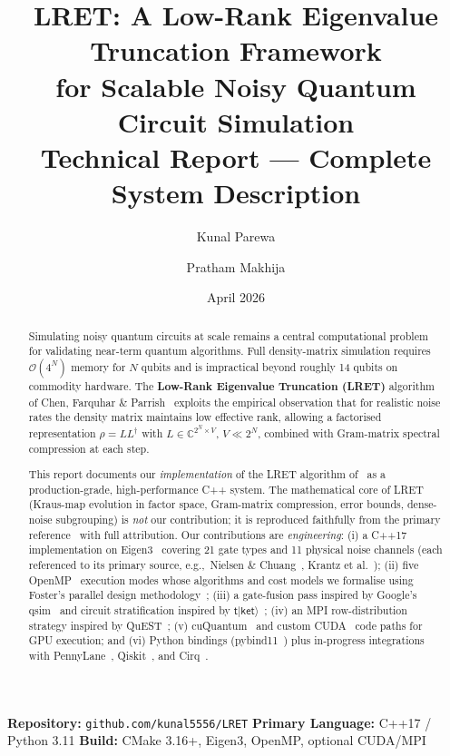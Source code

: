 \documentclass[11pt,a4paper]{article}
\title{%
  \vspace{-1cm}
  {\LARGE\bfseries LRET: A Low-Rank Eigenvalue Truncation Framework}\\[6pt]
  {\large for Scalable Noisy Quantum Circuit Simulation}\\[10pt]
  {\normalsize Technical Report --- Complete System Description}
}
\author{
  Kunal Parewa \and Pratham Makhija
}
\date{April 2026}
\begin{document}

\maketitle
\thispagestyle{empty}

\begin{infobox}
\textbf{Repository:} \texttt{github.com/kunal5556/LRET}\quad\textbullet\quad
\textbf{Primary Language:} C++17 / Python 3.11\quad\textbullet\quad
\textbf{Build:} CMake 3.16+, Eigen3, OpenMP, optional CUDA/MPI
\end{infobox}

\begin{abstract}
Simulating noisy quantum circuits at scale remains a central computational problem for
validating near-term quantum algorithms. Full density-matrix simulation requires
$\mathcal{O}(4^N)$ memory for $N$ qubits and is impractical beyond roughly 14 qubits on
commodity hardware. The \textbf{Low-Rank Eigenvalue Truncation (LRET)} algorithm of
Chen, Farquhar \& Parrish~\cite{chen2021lret} exploits the empirical observation that for
realistic noise rates the density matrix maintains low effective rank, allowing a
factorised representation $\rho = LL^\dagger$ with $L \in \mathbb{C}^{2^N \times V}$,
$V \ll 2^N$, combined with Gram-matrix spectral compression at each step.

This report documents our \emph{implementation} of the LRET algorithm of~\cite{chen2021lret}
as a production-grade, high-performance C++ system. The mathematical core of LRET
(Kraus-map evolution in factor space, Gram-matrix compression, error bounds, dense-noise
subgrouping) is \emph{not} our contribution; it is reproduced faithfully from the
primary reference~\cite{chen2021lret} with full attribution.
Our contributions are \emph{engineering}: (i) a C++17 implementation on
Eigen3~\cite{eigen2010} covering 21 gate types and 11 physical noise channels
(each referenced to its primary source, e.g.,\ Nielsen \& Chuang~\cite{nielsenchuang2010},
Krantz et al.~\cite{krantz2019}); (ii) five OpenMP~\cite{dagummenon1998} execution
modes whose algorithms and cost models we formalise using Foster's parallel design
methodology~\cite{foster1995}; (iii) a gate-fusion pass inspired by Google's
qsim~\cite{qsim} and circuit stratification inspired by
$\mathsf{t\vert ket\rangle}$~\cite{sivarajah2020tket}; (iv) an MPI row-distribution
strategy inspired by QuEST~\cite{jones2019quest}; (v) cuQuantum~\cite{bayraktar2023cuquantum}
and custom CUDA~\cite{nickolls2008cuda} code paths for GPU execution; and (vi) Python
bindings (pybind11~\cite{pybind11}) plus in-progress integrations with
PennyLane~\cite{bergholm2018pennylane}, Qiskit~\cite{javadi2024qiskit}, and
Cirq~\cite{cirq}.


\end{abstract}
\end{document}
